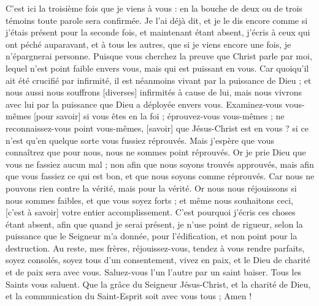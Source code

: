 \begin{multicols}{2}
\VerseOne{}C'est ici la troisième fois que je viens à vous : en la bouche de deux ou de trois témoins toute parole sera confirmée.
Je l'ai déjà dit, et je le dis encore comme si j'étais présent pour la seconde fois, et maintenant étant absent, j'écris à ceux qui ont péché auparavant, et à tous les autres, que si je viens encore une fois, je n'épargnerai personne.
Puisque vous cherchez la preuve que Christ parle par moi, lequel n'est point faible envers vous, mais qui est puissant en vous.
Car quoiqu'il ait été crucifié par infirmité, il est néanmoins vivant par la puissance de Dieu ; et nous aussi nous souffrons [diverses] infirmités à cause de lui, mais nous vivrons avec lui par la puissance que Dieu a déployée envers vous.
Examinez-vous vous-mêmes [pour savoir] si vous êtes en la foi ; éprouvez-vous vous-mêmes ; ne reconnaissez-vous point vous-mêmes, [savoir] que Jésus-Christ est en vous ? si ce n'est qu'en quelque sorte vous fussiez réprouvés.
Mais j'espère que vous connaîtrez que pour nous, nous ne sommes point réprouvés.
Or je prie Dieu que vous ne fassiez aucun mal ; non afin que nous soyons trouvés approuvés, mais afin que vous fassiez ce qui est bon, et que nous soyons comme réprouvés.
Car nous ne pouvons rien contre la vérité, mais pour la vérité.
Or nous nous réjouissons si nous sommes faibles, et que vous soyez forts ; et même nous souhaitons ceci, [c'est à savoir] votre entier accomplissement.
C'est pourquoi j'écris ces choses étant absent, afin que quand je serai présent, je n'use point de rigueur, selon la puissance que le Seigneur m'a donnée, pour l'édification, et non point pour la destruction.
Au reste, mes frères, réjouissez-vous, tendez à vous rendre parfaits, soyez consolés, soyez tous d'un consentement, vivez en paix, et le Dieu de charité et de paix sera avec vous.
Saluez-vous l'un l'autre par un saint baiser. Tous les Saints vous saluent.
Que la grâce du Seigneur Jésus-Christ, et la charité de Dieu, et la communication du Saint-Esprit soit avec vous tous ; Amen !
\PPE{}
\end{multicols}
